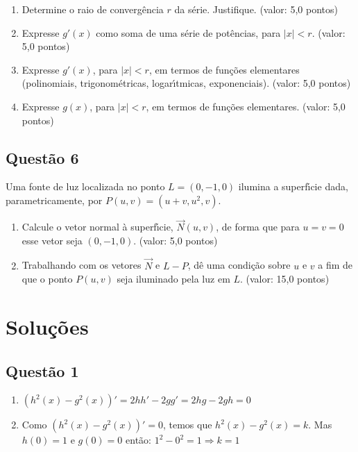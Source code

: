 \documentclass{report}
\begin{document}
\begin{enumerate}

\item[(a)] Determine o raio de converg\^encia $r$ da s\'erie. Justifique. (valor: 5,0 pontos) 

\item[(b)] Expresse $g'(x)$ como soma de uma s\'erie de pot\^encias, para $|x|<r$. (valor: 5,0 pontos)

\item[(c)] Expresse $g'(x)$, para $|x|<r$, em termos de fun\c c\~oes elementares (polinomiais, trigonom\'etricas, logar\'\i tmicas, exponenciais). (valor: 5,0 pontos)

\item[(d)] Expresse $g(x)$, para $|x|<r$, em termos de fun\c c\~oes elementares. (valor: 5,0 pontos)

\end{enumerate}

\subsection{\color{blue} Quest\~ao 6}

Uma fonte de luz localizada no ponto $L = (0,-1, 0)$ ilumina a superf\'\i cie dada, parametricamente, por $P(u,v) = (u + v, u^2, v)$.

\begin{enumerate}

\item[(a)] Calcule o vetor normal \`a superf\'\i cie, $\vec N (u,v)$, de forma que para $u = v = 0$ esse vetor seja $(0,-1, 0)$. (valor: 5,0 pontos)

\item[(b)] Trabalhando com os vetores $\vec N$ e $L-P$, d\^e uma condi\c c\~ao sobre $u$ e $v$ a fim de que o ponto $P(u,v)$ seja iluminado pela luz em $L$. (valor: 15,0 pontos)

\end{enumerate}

\section{\color{red} Solu\c c\~oes}

\subsection{\color{red} Quest\~ao 1}

\begin{enumerate}

\item[(a)] $(h^2(x)-g^2(x))'=2hh'-2gg'=2hg-2gh=0$

\item[(b)] Como $(h^2(x)-g^2(x))'=0$, temos que $h^2(x)-g^2(x)=k$. Mas $h(0)=1$ e $g(0)=0$ ent\~ao: $1^2-0^2=1\Longrightarrow k=1$

\end{enumerate}
\end{document}
